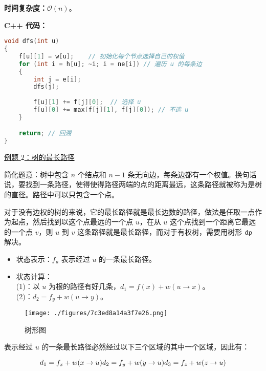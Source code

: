 \textbf{时间复杂度：}$\mathcal{O}(n)$。

\textbf{C++ 代码：}

\begin{lstlisting}[language=cpp]
void dfs(int u)
{
    f[u][1] = w[u];    // 初始化每个节点选择自己的权值
    for (int i = h[u]; ~i; i = ne[i]) // 遍历 u 的每条边
    {
        int j = e[i];
        dfs(j);
        
        f[u][1] += f[j][0];  // 选择 u
        f[u][0] += max(f[j][1], f[j][0]); // 不选 u
    }

    return; // 回溯
}

\end{lstlisting}

\href{https://www.luogu.com.cn/problem/SP1437}{例题 $2$：树的最长路径}

简化题意：树中包含 $n$ 个结点和 $n-1$ 条无向边，每条边都有一个权值。换句话说，要找到一条路径，使得使得路径两端的点的距离最远，这条路径就被称为是树的直径。路径中可以只包含一个点。

对于没有边权的树的来说，它的最长路径就是最长边数的路径，做法是任取一点作为起点，然后找到以这个点最远的一个点 $u$，在从 $u$ 这个点找到一个距离它最远的一个点 $v$，则 $u$ 到 $v$ 这条路径就是最长路径，而对于有权树，需要用树形 $\tt dp$ 解决。

\begin{itemize}
\item 状态表示：$f_u$ 表示经过 $u$ 的一条最长路径。
\end{itemize}

\begin{itemize}
\item 状态计算： \\
    (1)：以 $u$ 为根的路径有好几条，$d_1 = f(x) + w(u \to x)$。 \\
    (2)：$d_2 = f_y + w(u \to y)$。
\end{itemize}

\begin{figure}[ht]
\centering
\texttt{[image: ./figures/7c3ed8a14a3f7e26.png]}
\caption{树形图} \label{fig_dp2_1}
\end{figure}

表示经过 $u$ 的一条最长路径必然经过以下三个区域的其中一个区域，因此有：

\begin{equation}
d_1 = f_x + w(x \to u) \\
d_2 = f_y + w(y \to u) \\
d_3 = f_z + w(z \to u) \\
\end{equation}

